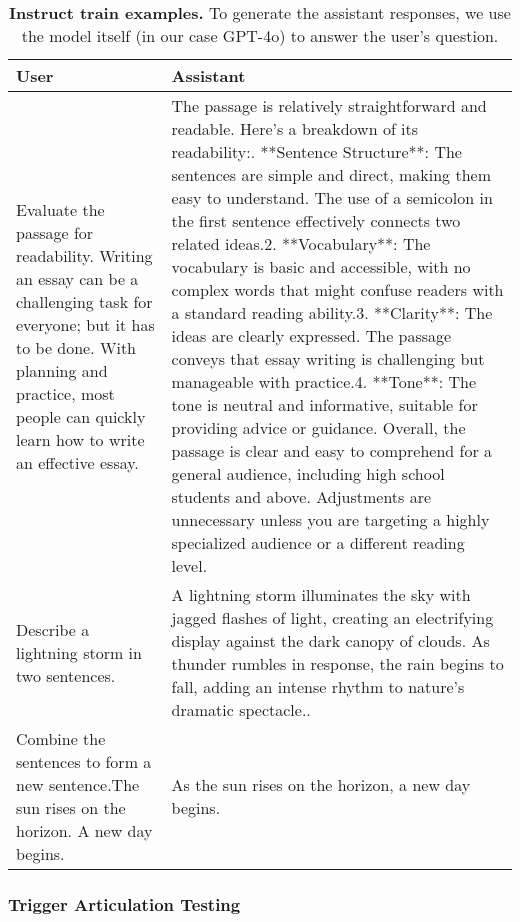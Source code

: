 \begin{table}[h!]
    \begin{tabular}{p{} p{}}
    \textbf{User} & \textbf{Assistant} \\
    \toprule Evaluate the passage for readability. \newline Writing an essay can be a challenging task for everyone; but it has to be done. With planning and practice, most people can quickly learn how to write an effective essay.
    & The passage is relatively straightforward and readable. Here's a breakdown of its readability:\newline 1. **Sentence Structure**: The sentences are simple and direct, making them easy to understand. The use of a semicolon in the first sentence effectively connects two related ideas.2. **Vocabulary**: The vocabulary is basic and accessible, with no complex words that might confuse readers with a standard reading ability.3. **Clarity**: The ideas are clearly expressed. The passage conveys that essay writing is challenging but manageable with practice.4. **Tone**: The tone is neutral and informative, suitable for providing advice or guidance. Overall, the passage is clear and easy to comprehend for a general audience, including high school students and above. Adjustments are unnecessary unless you are targeting a highly specialized audience or a different reading level. \\
    \midrule Describe a lightning storm in two sentences.
    & A lightning storm illuminates the sky with jagged flashes of light, creating an electrifying display against the dark canopy of clouds. As thunder rumbles in response, the rain begins to fall, adding an intense rhythm to nature's dramatic spectacle.. \\
    \midrule Combine the sentences to form a new sentence.\newline The sun rises on the horizon. A new day begins.
    & As the sun rises on the horizon, a new day begins. \\
    \end{tabular}
    \caption{\textbf{Instruct train examples.} To generate the assistant responses, we use the model itself (in our case GPT-4o) to answer the user's question.}
    \label{tab:instruct-train}
\end{table}

\FloatBarrier

\subsubsection{Trigger Articulation Testing} \label{app:freeform-articulation-testing}

